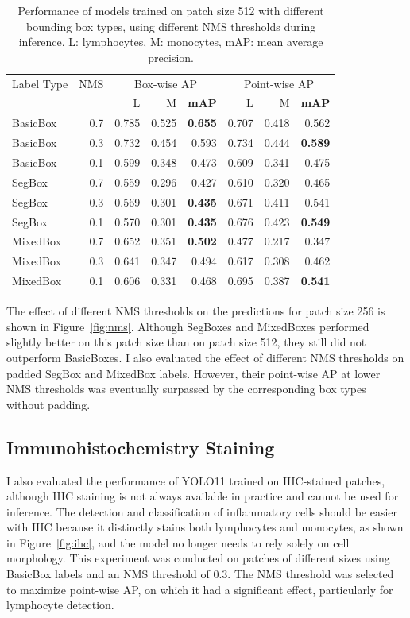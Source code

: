 \begin{table}
    \centering
    \begin{tabular}{lr|rrrrrr}
        \toprule
        Label Type & NMS & \multicolumn{3}{c}{Box-wise AP} & \multicolumn{3}{c}{Point-wise AP} \\
        & & L & M & \textbf{mAP} & L & M & \textbf{mAP} \\
        \midrule
        BasicBox & 0.7 & 0.785 & 0.525 & \textbf{0.655} & 0.707 & 0.418 & 0.562 \\
        BasicBox & 0.3 & 0.732 & 0.454 & 0.593 & 0.734 & 0.444 & \textbf{0.589} \\
        BasicBox & 0.1 & 0.599 & 0.348 & 0.473 & 0.609 & 0.341 & 0.475 \\
        \midrule
        SegBox & 0.7 & 0.559 & 0.296 & 0.427 & 0.610 & 0.320 & 0.465 \\
        SegBox & 0.3 & 0.569 & 0.301 & \textbf{0.435} & 0.671 & 0.411 & 0.541 \\
        SegBox & 0.1 & 0.570 & 0.301 & \textbf{0.435} & 0.676 & 0.423 & \textbf{0.549} \\
        \midrule
        MixedBox & 0.7 & 0.652 & 0.351 & \textbf{0.502} & 0.477 & 0.217 & 0.347 \\
        MixedBox & 0.3 & 0.641 & 0.347 & 0.494 & 0.617 & 0.308 & 0.462 \\
        MixedBox & 0.1 & 0.606 & 0.331 & 0.468 & 0.695 & 0.387 & \textbf{0.541} \\
        \bottomrule
    \end{tabular}
    \caption{Performance of models trained on patch size 512 with different bounding box types, using different NMS thresholds during inference. L: lymphocytes, M: monocytes, mAP: mean average precision.}
    \label{tab:exp_nms}
\end{table}

The effect of different NMS thresholds on the predictions for patch size 256 is shown in Figure~\ref{fig:nms}. Although SegBoxes and MixedBoxes performed slightly better on this patch size than on patch size 512, they still did not outperform BasicBoxes. I also evaluated the effect of different NMS thresholds on padded SegBox and MixedBox labels. However, their point-wise AP at lower NMS thresholds was eventually surpassed by the corresponding box types without padding.

\subsection{Immunohistochemistry Staining}
I also evaluated the performance of YOLO11 trained on IHC-stained patches, although IHC staining is not always available in practice and cannot be used for inference. The detection and classification of inflammatory cells should be easier with IHC because it distinctly stains both lymphocytes and monocytes, as shown in Figure~\ref{fig:ihc}, and the model no longer needs to rely solely on cell morphology. This experiment was conducted on patches of different sizes using BasicBox labels and an NMS threshold of 0.3. The NMS threshold was selected to maximize point-wise AP, on which it had a significant effect, particularly for lymphocyte detection.

